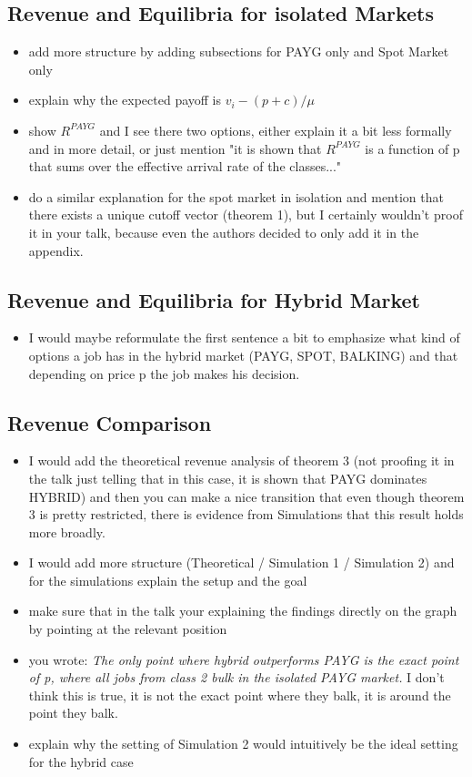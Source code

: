 \documentclass[]{article}
\begin{document}
\subsection{Revenue and Equilibria for isolated Markets}
\begin{itemize}
	\item add more structure by adding subsections for PAYG only and Spot Market only
	\item explain why the expected payoff is $v_{i}-(p+c)/\mu$
	\item show $R^{PAYG}$ and I see there two options, either explain it a bit less formally and in more detail, or just mention "it is shown that $R^{PAYG}$ is a function of p that sums over the effective arrival rate of the classes..."
	\item do a similar explanation for the spot market in isolation and mention that there exists a unique cutoff vector (theorem 1), but I certainly wouldn't proof it in your talk, because even the authors decided to only add it in the appendix.
\end{itemize}

\subsection{Revenue and Equilibria for Hybrid Market}
\begin{itemize}
	\item I would maybe reformulate the first sentence a bit to emphasize what kind of options a job has in the hybrid market (PAYG, SPOT, BALKING) and that depending on price p the job makes his decision.
\end{itemize}

\subsection{Revenue Comparison}
\begin{itemize}
	\item I would add the theoretical revenue analysis of theorem 3 (not proofing it in the talk just telling that in this case, it is shown that PAYG dominates HYBRID) and then you can make a nice transition that even though theorem 3 is pretty restricted, there is evidence from Simulations that this result holds more broadly.
	\item I would add more structure (Theoretical / Simulation 1 / Simulation 2) and for the simulations explain the setup and the goal
	\item make sure that in the talk your explaining the findings directly on the graph by pointing at the relevant position
	\item you wrote: \textit{The only point where hybrid outperforms PAYG is the exact point of p, where all jobs from class 2 bulk in the isolated PAYG market.} I don't think this is true, it is not the exact point where they balk, it is around the point they balk.
	\item explain why the setting of Simulation 2 would intuitively be the ideal setting for the hybrid case
\end{itemize}
\end{document}
